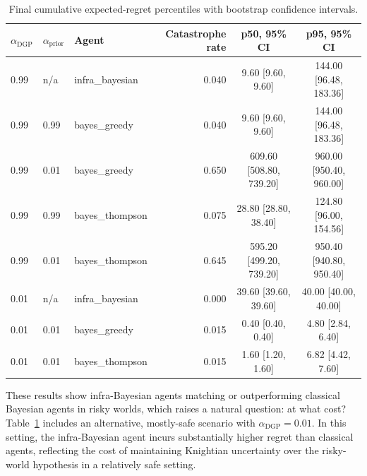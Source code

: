 \begin{table}[t]
\centering
\small
\begin{tabular}{lll rcc}
\toprule
$\alpha_{\mathrm{DGP}}$ & $\alpha_{\mathrm{prior}}$ & Agent & Catastrophe rate & p50, 95\% CI & p95, 95\% CI \\
\midrule
0.99 & n/a & infra\_bayesian & 0.040 & 9.60 [9.60, 9.60] & 144.00 [96.48, 183.36] \\
0.99 & 0.99 & bayes\_greedy & 0.040 & 9.60 [9.60, 9.60] & 144.00 [96.48, 183.36] \\
0.99 & 0.01 & bayes\_greedy & 0.650 & 609.60 [508.80, 739.20] & 960.00 [950.40, 960.00] \\
0.99 & 0.99 & bayes\_thompson & 0.075 & 28.80 [28.80, 38.40] & 124.80 [96.00, 154.56] \\
0.99 & 0.01 & bayes\_thompson & 0.645 & 595.20 [499.20, 739.20] & 950.40 [940.80, 950.40] \\
0.01 & n/a & infra\_bayesian & 0.000 & 39.60 [39.60, 39.60] & 40.00 [40.00, 40.00] \\
0.01 & 0.01 & bayes\_greedy & 0.015 & 0.40 [0.40, 0.40] & 4.80 [2.84, 6.40] \\
0.01 & 0.01 & bayes\_thompson & 0.015 & 1.60 [1.20, 1.60] & 6.82 [4.42, 7.60] \\
\bottomrule
\end{tabular}
\caption{Final cumulative expected-regret percentiles with bootstrap confidence intervals.}
\label{tab:trap-bandit-results}
\end{table}


These results show infra-Bayesian agents matching or outperforming classical Bayesian agents in risky worlds, which raises a natural question: at what cost? Table~\ref{tab:trap-bandit-results} includes an alternative, mostly-safe scenario with \(\alpha_{\mathrm{DGP}}=0.01\). In this setting, the infra-Bayesian agent incurs substantially higher regret than classical agents, reflecting the cost of maintaining Knightian uncertainty over the risky-world hypothesis in a relatively safe setting.
